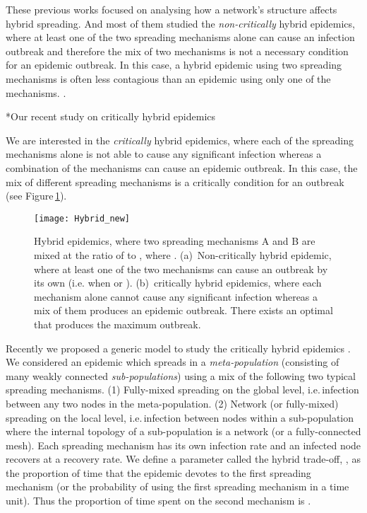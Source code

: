 \documentclass[9pt]{article}
\makeatletter
\newcommand{\reffig}[1]{Figure\,\ref{#1}}
\renewcommand{\subsection}{\@startsection {subsection}{2}{0pt}{-6pt}{1pt}{\reset@font \normalsize \bfseries}}
\makeatother
\begin{document}
These previous works focused on analysing how a network's structure affects hybrid spreading. And most of them studied the {\em non-critically} hybrid epidemics, where at least one of the two spreading mechanisms alone can cause an infection outbreak and therefore the mix of two mechanisms is not a necessary condition for an epidemic outbreak. In this case, a hybrid epidemic using two spreading mechanisms is often less contagious than an epidemic using only one of the  mechanisms. \cite{Kiss_Green_Kao_2006, Wang_Jin_2013}. 






\subsection*{Our recent study on critically hybrid epidemics}

We are interested in the {\em critically} hybrid epidemics, where each of the spreading mechanisms alone is not able to cause any significant infection whereas a combination of the mechanisms can cause an epidemic outbreak.
In this case, the mix of different spreading mechanisms is a critically condition for an outbreak 
(see \reffig{fig-Hybrid}).

\begin{figure}[h]
\small\centering
\texttt{[image: Hybrid\_new]}
\caption{\label{fig-Hybrid}Hybrid epidemics, where two spreading mechanisms A and B are mixed at the ratio of  to , where . (a)~Non-critically hybrid epidemic, where at least one of the two mechanisms can cause an outbreak by its own (i.e. when  or ). (b)~critically hybrid epidemics, where each mechanism alone cannot cause any significant infection whereas a mix of them produces an epidemic outbreak. There exists an optimal  that produces the maximum outbreak.}
\end{figure}

Recently we proposed a generic model to study the critically hybrid epidemics \cite{Zhang_hm_2014}.
We considered an epidemic which spreads in a {\em meta-population} (consisting of many weakly connected {\em sub-populations}) using a mix of the following two typical spreading mechanisms.
(1) Fully-mixed spreading on the global level, i.e.\,infection between any two nodes in the meta-population.
(2) Network (or fully-mixed) spreading on the local level, i.e.\,infection between nodes within a sub-population where the internal topology of a sub-population is a network (or a fully-connected mesh). 
Each spreading mechanism has its own infection rate and an infected node recovers at a recovery rate. 
We define a parameter called the hybrid trade-off, , as the proportion of time that the epidemic devotes to the first spreading mechanism (or the probability of using the first spreading mechanism in a time unit). Thus the proportion of time spent on the second mechanism is . 
\end{document}
